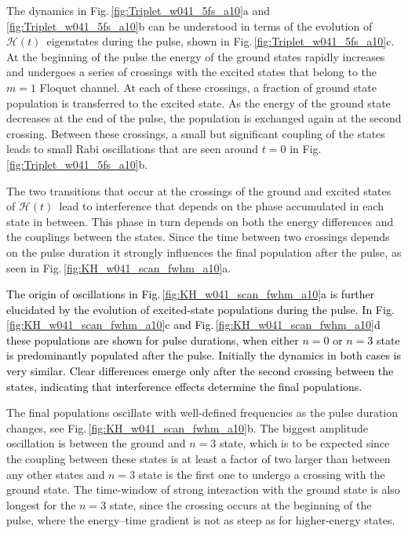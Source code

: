 \documentclass[
pra%
,preprint%
,amssymb, nobibnotes, aps, superscriptaddress, floatfix]{revtex4}
\newcommand{\fig}{Fig.\,}
\newcommand{\CAHt}{$\mathcal{H}(t)$}
\newcommand{\editt}[1]{\textcolor{black}{#1}}
\begin{document}
%
%
%

The dynamics in \fig \ref{fig:Triplet_w041_5fs_a10}a and \ref{fig:Triplet_w041_5fs_a10}b can be understood in terms of the evolution of \CAHt\ eigenstates during the pulse, shown in \fig \ref{fig:Triplet_w041_5fs_a10}c.
At the beginning of the pulse the energy of the ground states rapidly increases and undergoes a series of crossings with the excited states that belong to the $m=1$ Floquet channel. At each of these crossings, a fraction of ground state population is transferred to the excited state. As the energy of the ground state decreases at the end of the pulse, the population is exchanged again at the second crossing. Between these crossings, a small but significant coupling of the states leads to small Rabi oscillations that are seen around $t=0$ in \fig \ref{fig:Triplet_w041_5fs_a10}b.


The two transitions that occur at the crossings of the ground and excited states of \CAHt\ lead to interference that depends on the phase accumulated in each state in between. This phase in turn depends on both the energy differences and the couplings between the states. Since the time between two crossings depends on the pulse duration it strongly influences the final population after the pulse, as seen in \fig \ref{fig:KH_w041_scan_fwhm_a10}a. 

\editt{
The origin of oscillations in \fig \ref{fig:KH_w041_scan_fwhm_a10}a is further elucidated by the evolution of excited-state populations during the pulse. In \fig \ref{fig:KH_w041_scan_fwhm_a10}c and \fig \ref{fig:KH_w041_scan_fwhm_a10}d these populations are shown for pulse durations, when either $n=0$ or $n=3$ state is predominantly populated after the pulse. Initially the dynamics in both cases is very similar. Clear differences emerge only after the second crossing between the states, indicating that interference effects determine the final populations. }

The final populations oscillate with well-defined frequencies as the pulse duration changes, see \fig \ref{fig:KH_w041_scan_fwhm_a10}b. 
The biggest amplitude oscillation is between the ground and $n=3$ state, which is to be expected since the coupling between these states is at least a factor of two larger than between any other states and $n=3$ state is the first one to undergo a crossing with the ground state. The time-window of strong interaction with the ground state is also longest for the $n=3$ state, since the crossing occurs at the beginning of the pulse, where the energy--time gradient is not as steep as for higher-energy states.
\end{document}
